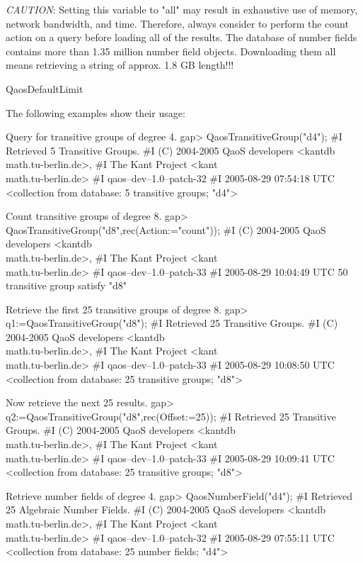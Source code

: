 \emph{CAUTION}: Setting this variable to "all" may result in exhaustive use of memory,
network bandwidth, and time.  Therefore, always consider to perform the count
action on a query before loading all of the results.  The database of number
fields contains more than 1.35 million number field objects.  Downloading them
all means retrieving a string of approx. 1.8 GB length!!!

\vindex QaosDefaultLimit


The following examples show their usage:

Query for transitive groups of degree 4.
\beginexample
gap> QaosTransitiveGroup("d4");
#I Retrieved 5 Transitive Groups.
#I (C) 2004-2005 QaoS developers <kantdb\\math.tu-berlin.de>,
#I The Kant Project <kant\\math.tu-berlin.de>
#I qaos--dev--1.0--patch-32
#I 2005-08-29 07:54:18 UTC
<collection from database: 5 transitive groups; "d4">
\endexample

Count transitive groups of degree 8.
\beginexample
gap> QaosTransitiveGroup("d8",rec(Action:="count"));
#I (C) 2004-2005 QaoS developers <kantdb\\math.tu-berlin.de>,
#I The Kant Project <kant\\math.tu-berlin.de>
#I qaos--dev--1.0--patch-33
#I 2005-08-29 10:04:49 UTC
50 transitive group satisfy "d8"
\endexample

Retrieve the first 25 transitive groups of degree 8.
\beginexample
gap> q1:=QaosTransitiveGroup("d8");
#I Retrieved 25 Transitive Groups.
#I (C) 2004-2005 QaoS developers <kantdb\\math.tu-berlin.de>,
#I The Kant Project <kant\\math.tu-berlin.de>
#I qaos--dev--1.0--patch-33
#I 2005-08-29 10:08:50 UTC
<collection from database: 25 transitive groups; "d8">
\endexample

Now retrieve the next 25 results.
\beginexample
gap> q2:=QaosTransitiveGroup("d8",rec(Offset:=25));
#I Retrieved 25 Transitive Groups.
#I (C) 2004-2005 QaoS developers <kantdb\\math.tu-berlin.de>,
#I The Kant Project <kant\\math.tu-berlin.de>
#I qaos--dev--1.0--patch-33
#I 2005-08-29 10:09:41 UTC
<collection from database: 25 transitive groups; "d8">
\endexample

Retrieve number fields of degree 4.
\beginexample
gap> QaosNumberField("d4");
#I Retrieved 25 Algebraic Number Fields.
#I (C) 2004-2005 QaoS developers <kantdb\\math.tu-berlin.de>,
#I The Kant Project <kant\\math.tu-berlin.de>
#I qaos--dev--1.0--patch-32
#I 2005-08-29 07:55:11 UTC
<collection from database: 25 number fields; "d4">
\endexample


